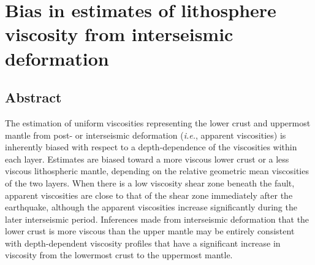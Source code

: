 \chapter{Bias in estimates of lithosphere viscosity from interseismic deformation}

\section{Abstract}
The estimation of uniform viscosities representing the lower crust and uppermost mantle from post- or interseismic deformation ({\it i.e.}, apparent viscosities) is inherently biased with respect to a depth-dependence of the viscosities within each layer. Estimates are biased toward a more viscous lower crust or a less viscous lithospheric mantle, depending on the relative geometric mean viscosities of the two layers. When there is a low viscosity shear zone beneath the fault, apparent viscosities are close to that of the shear zone immediately after the earthquake, although the apparent viscosities increase significantly during the later interseismic period.  Inferences made from interseismic deformation that the lower crust is more viscous than the upper mantle may be entirely consistent with depth-dependent viscosity profiles that have a significant increase in viscosity from the lowermost crust to the uppermost mantle.

